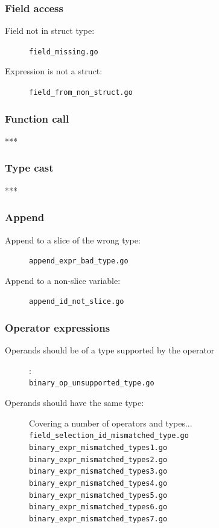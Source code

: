 \documentclass[oneside]{article}
\begin{document}
\subsubsection{Field access}
\begin{description}
  \item[Field not in struct type:] \verb|field_missing.go|
  \item[Expression is not a struct:] \verb|field_from_non_struct.go|
\end{description}

\subsubsection{Function call}
***

\subsubsection{Type cast}
***

\subsubsection{Append}
\begin{description}
  \item[Append to a slice of the wrong type:] \verb|append_expr_bad_type.go|
  \item[Append to a non-slice variable:] \verb|append_id_not_slice.go|
\end{description}

\subsubsection{Operator expressions}
\begin{description}
  \item[Operands should be of a type supported by the operator]: \\
    \verb|binary_op_unsupported_type.go|
  \item[Operands should have the same type:] Covering a number of operators and types...\\
    \verb|field_selection_id_mismatched_type.go|\\
    \verb|binary_expr_mismatched_types1.go|\\
    \verb|binary_expr_mismatched_types2.go|\\
    \verb|binary_expr_mismatched_types3.go|\\
    \verb|binary_expr_mismatched_types4.go|\\
    \verb|binary_expr_mismatched_types5.go|\\
    \verb|binary_expr_mismatched_types6.go|\\
    \verb|binary_expr_mismatched_types7.go|
\end{description}
\end{document}
